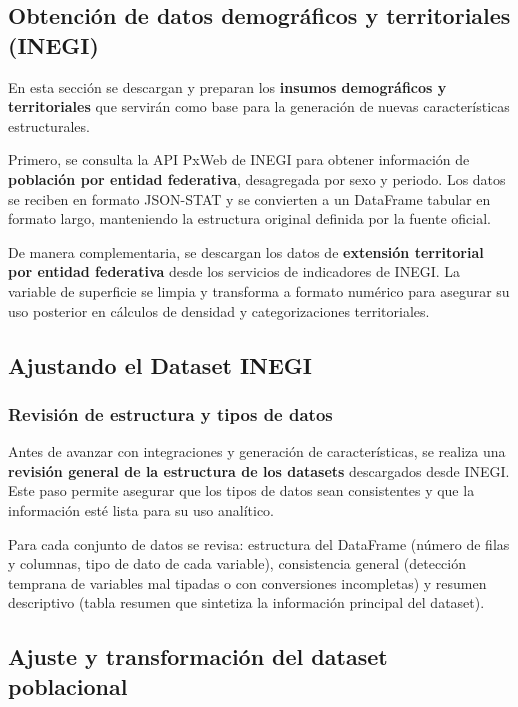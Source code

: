 \documentclass[12pt,letterpaper]{article}
\begin{document}
\subsection{Obtención de datos demográficos y territoriales (INEGI)}

En esta sección se descargan y preparan los \textbf{insumos demográficos y territoriales} que servirán como base para la generación de nuevas características estructurales.

Primero, se consulta la API PxWeb de INEGI para obtener información de \textbf{población por entidad federativa}, desagregada por sexo y periodo. Los datos se reciben en formato JSON-STAT y se convierten a un DataFrame tabular en formato largo, manteniendo la estructura original definida por la fuente oficial.

De manera complementaria, se descargan los datos de \textbf{extensión territorial por entidad federativa} desde los servicios de indicadores de INEGI. La variable de superficie se limpia y transforma a formato numérico para asegurar su uso posterior en cálculos de densidad y categorizaciones territoriales.

\subsection{Ajustando el Dataset INEGI}

\subsubsection{Revisión de estructura y tipos de datos}

Antes de avanzar con integraciones y generación de características, se realiza una \textbf{revisión general de la estructura de los datasets} descargados desde INEGI. Este paso permite asegurar que los tipos de datos sean consistentes y que la información esté lista para su uso analítico.

Para cada conjunto de datos se revisa: estructura del DataFrame (número de filas y columnas, tipo de dato de cada variable), consistencia general (detección temprana de variables mal tipadas o con conversiones incompletas) y resumen descriptivo (tabla resumen que sintetiza la información principal del dataset).

\subsection{Ajuste y transformación del dataset poblacional}
\end{document}

